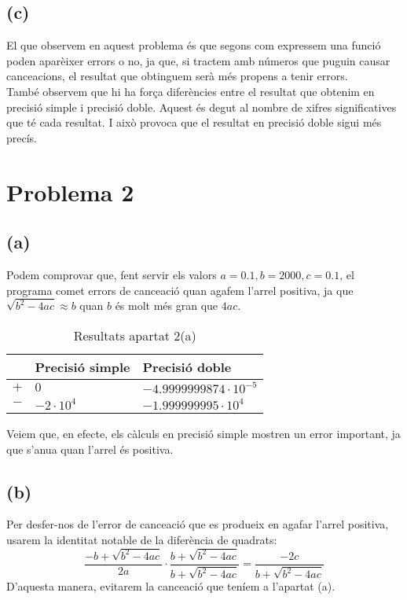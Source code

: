 \documentclass[a4paper,10pt]{article}
\begin{document}
  \subsection*{(c)}
  El que observem en aquest problema és que segons com expressem una funció poden aparèixer errors o no, ja que, si tractem amb números que puguin causar cance\lgem acions, el resultat que obtinguem serà més propens a tenir errors.\\
  També observem que hi ha força diferències entre el resultat que obtenim en precisió simple i precisió doble. Aquest és degut al nombre de xifres significatives que té cada resultat. I això provoca que el resultat en precisió doble sigui més precís.
  \newpage
\section*{Problema 2}
  \subsection*{(a)}
  Podem comprovar que, fent servir els valors $a = 0.1, b = 2000, c = 0.1$, el programa comet errors de cance\lgem ació quan agafem l'arrel positiva, ja que $\sqrt{b^2 - 4ac} \approx b$ quan $b$ és molt més gran que $4ac$.
  \begin{table}[H]
    \begin{center}
      \begin{tabular}[c]{|p{10mm}|p{35mm}|p{35mm}|}
      \hline 
      & Precisió simple & Precisió doble \\ 
      \hline 
      $+$
      &
      $0$
      &
      $-4.9999999874 \cdot 10^{-5}$ \\
      \hline
      $-$
      &
      $-2 \cdot 10^4$
      &
      $-1.999999995 \cdot 10^4$\\
      \hline
      \end{tabular}
    \caption{Resultats apartat 2(a)}
    \end{center}
  \end{table}
  Veiem que, en efecte, els càlculs en precisió simple mostren un error important, ja que s'anu\lgem a quan l'arrel és positiva.
  \subsection*{(b)}
  Per desfer-nos de l'error de cance\lgem ació que es produeix en agafar l'arrel positiva, usarem la identitat notable de la diferència de quadrats:
  \begin{equation*}
    \frac{-b + \sqrt{b^2 - 4ac}}{2a} \cdot \frac{b + \sqrt{b^2 - 4ac}}{b + \sqrt{b^2 - 4ac}}
    =
    \frac{-2c}{b + \sqrt{b^2 - 4ac}}
  \end{equation*}
  D'aquesta manera, evitarem la cance\lgem ació que teníem a l'apartat (a).
\end{document}
